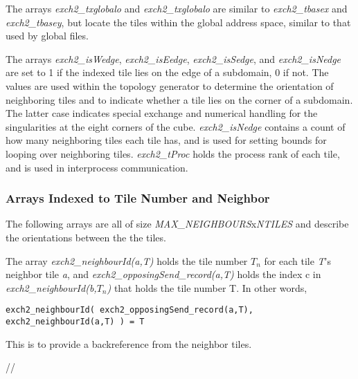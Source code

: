 The arrays {\em exch2\_txglobalo} and {\em exch2\_txglobalo} are similar to
{\em exch2\_tbasex} and {\em exch2\_tbasey}, but locate the tiles within
the global address space, similar to that used by global files.  

The arrays {\em exch2\_isWedge}, {\em exch2\_isEedge}, {\em exch2\_isSedge}, 
and {\em exch2\_isNedge} are set to 1 if the indexed tile lies on the edge
of a subdomain, 0 if not.  The values are used within the topology generator
to determine the orientation of neighboring tiles and to indicate whether 
a tile lies on the corner of a subdomain.  The latter case indicates 
special exchange and numerical handling for the singularities at the eight 
corners of the cube.  {\em exch2\_isNedge} contains a count of how many
neighboring tiles each tile has, and is used for setting bounds for looping
over neighboring tiles.  {\em exch2\_tProc} holds the process rank of each tile,
and is used in interprocess communication.

\subsubsection{Arrays Indexed to Tile Number and Neighbor}

The following arrays are all of size {\em MAX\_NEIGHBOURS}x{\em NTILES} and
describe the orientations between the the tiles.

The array {\em exch2\_neighbourId(a,T)} holds the tile number $T_{n}$ for each tile 
{\em T}'s neighbor tile {\em a}, and {\em exch2\_opposingSend\_record(a,T)} holds 
the index c in {\em exch2\_neighbourId(b,$T_{n}$)} that holds the tile number T.
In other words,

\begin{verbatim}   
exch2_neighbourId( exch2_opposingSend_record(a,T), exch2_neighbourId(a,T) ) = T
\end{verbatim}


This is to provide a backreference from the neighbor tiles.


//

